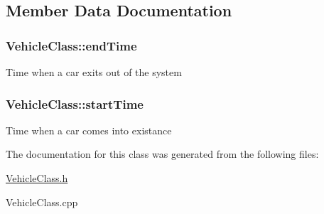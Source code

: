 \subsection{Member Data Documentation}
\hypertarget{class_vehicle_class_ae11f41b18fa726d81c0156162b4554d0}{
\subsubsection[{end\-Time}]{ Vehicle\-Class\-::end\-Time}}\label{class_vehicle_class_ae11f41b18fa726d81c0156162b4554d0}
Time when a car exits out of the system \hypertarget{class_vehicle_class_acafc6e10e1f8b5181fbed411d7a57f35}{
\subsubsection[{start\-Time}]{ Vehicle\-Class\-::start\-Time}}\label{class_vehicle_class_acafc6e10e1f8b5181fbed411d7a57f35}
Time when a car comes into existance 

The documentation for this class was generated from the following files\-:\begin{DoxyCompactItemize}
\item 
\hyperlink{_vehicle_class_8h}{Vehicle\-Class.\-h}\item 
Vehicle\-Class.\-cpp\end{DoxyCompactItemize}
